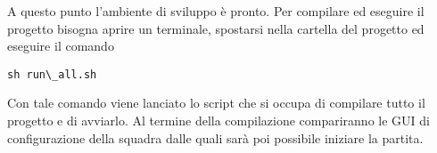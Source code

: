 \noindent A questo punto l'ambiente di sviluppo \`{e} pronto. Per compilare ed eseguire il progetto bisogna aprire un terminale, spostarsi nella cartella del progetto ed eseguire il comando\\

\begin{center}
	\verb+sh run\_all.sh+\\
\end{center}

Con tale comando viene lanciato lo script che si occupa di compilare tutto il progetto e di avviarlo. Al termine della compilazione compariranno le GUI di configurazione della squadra dalle quali sar\`{a} poi possibile iniziare la partita.